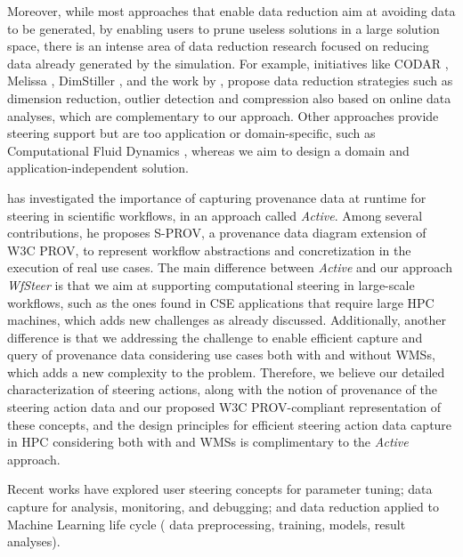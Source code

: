 Moreover, while most approaches that enable data reduction aim at avoiding data to be generated, \eg{} by
enabling users to prune useless solutions in a large solution space,
there is an intense area of data reduction research focused on reducing
data already generated by the simulation. For example, initiatives like
CODAR \cite{Foster2017Computing},
Melissa \cite{Terraz2017Melissa:},
DimStiller \cite{Ingram2010Dimstiller:},
and the work by \citet{Jin2013Using},
propose data reduction strategies such as dimension reduction, outlier
detection and compression also based on online data analyses, which are
complementary to our approach. Other approaches provide steering support
but are too application or domain-specific, such as Computational Fluid
Dynamics \cite{Garcia2015Computational},
whereas we aim to design a domain and application-independent solution.

\citet{Spinuso2018Active} has investigated the importance of  capturing provenance data at runtime for steering in scientific workflows, in an approach called \textit{Active}. Among several contributions, he proposes S-PROV, a provenance data diagram extension of  W3C PROV, to represent workflow abstractions and concretization in the execution of real use cases.
The main difference between \textit{Active} and our approach \textit{WfSteer} is that we aim at supporting computational steering in large-scale workflows, such as the ones found in CSE applications that require large HPC machines, which adds new challenges as already discussed.
Additionally, another difference is that we addressing the challenge to enable efficient capture and query of provenance  data considering use cases both with and without WMSs, which adds a new complexity to the problem.
Therefore, we believe our detailed characterization of steering actions, along with the notion of provenance of the steering action data and our proposed W3C PROV-compliant representation of these concepts, and the design principles for efficient steering action data capture in HPC considering both with and WMSs is complimentary to the \textit{Active} approach.


Recent works \cite{Zhang2017Diagnosing,Re2015Machine,Xin2018Accelerating,souza_provenancedata_2019}
have explored user steering concepts for parameter tuning; data
capture for analysis, monitoring, and debugging; and data reduction
applied to Machine Learning life cycle (\eg{} data preprocessing,
training, models, result analyses).

